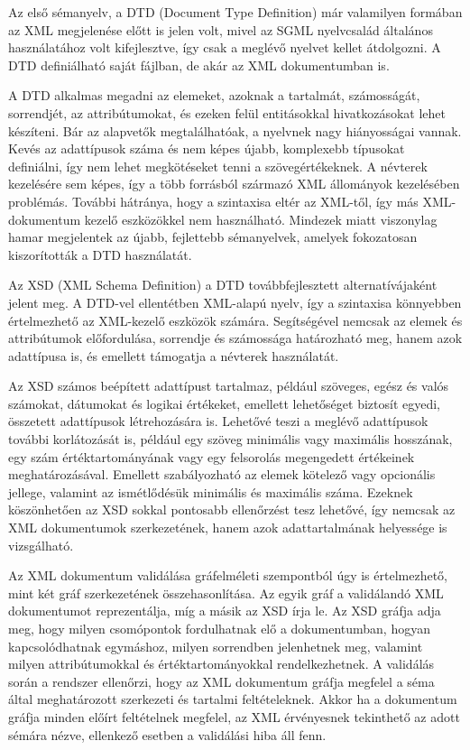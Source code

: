 Az első sémanyelv, a DTD (Document Type Definition) \cite{dtd} már valamilyen formában az XML megjelenése előtt is jelen volt, mivel az SGML nyelvcsalád általános használatához volt kifejlesztve, így csak a meglévő nyelvet kellet átdolgozni. A DTD definiálható saját fájlban, de akár az XML dokumentumban is.

A DTD alkalmas megadni az elemeket, azoknak a tartalmát, számosságát, sorrendjét, az attribútumokat, és ezeken felül entitásokkal hivatkozásokat lehet készíteni. Bár az alapvetők megtalálhatóak, a nyelvnek nagy hiányosságai vannak. Kevés az adattípusok száma és nem képes újabb, komplexebb típusokat definiálni, így nem lehet megkötéseket tenni a szövegértékeknek. A névterek kezelésére sem képes, így a több forrásból származó XML állományok kezelésében problémás. További hátránya, hogy a szintaxisa eltér az XML-től, így más XML-dokumentum kezelő eszközökkel nem használható. Mindezek miatt viszonylag hamar megjelentek az újabb, fejlettebb sémanyelvek, amelyek fokozatosan kiszorították a DTD használatát.

Az XSD (XML Schema Definition) \cite{xsd} a DTD továbbfejlesztett alternatívájaként jelent meg. A DTD-vel ellentétben XML-alapú nyelv, így a szintaxisa könnyebben értelmezhető az XML-kezelő eszközök számára. Segítségével nemcsak az elemek és attribútumok előfordulása, sorrendje és számossága határozható meg, hanem azok adattípusa is, és emellett támogatja a névterek használatát.

Az XSD számos beépített adattípust tartalmaz, például szöveges, egész és valós számokat, dátumokat és logikai értékeket, emellett lehetőséget biztosít egyedi, összetett adattípusok létrehozására is. Lehetővé teszi a meglévő adattípusok további korlátozását is, például egy szöveg minimális vagy maximális hosszának, egy szám értéktartományának vagy egy felsorolás megengedett értékeinek meghatározásával. Emellett szabályozható az elemek kötelező vagy opcionális jellege, valamint az ismétlődésük minimális és maximális száma. Ezeknek köszönhetően az XSD sokkal pontosabb ellenőrzést tesz lehetővé, így nemcsak az XML dokumentumok szerkezetének, hanem azok adattartalmának helyessége is vizsgálható.

Az XML dokumentum validálása gráfelméleti szempontból úgy is értelmezhető, mint két gráf szerkezetének összehasonlítása. Az egyik gráf a validálandó XML dokumentumot reprezentálja, míg a másik az XSD írja le. Az XSD gráfja adja meg, hogy milyen csomópontok fordulhatnak elő a dokumentumban, hogyan kapcsolódhatnak egymáshoz, milyen sorrendben jelenhetnek meg, valamint milyen attribútumokkal és értéktartományokkal rendelkezhetnek. A validálás során a rendszer ellenőrzi, hogy az XML dokumentum gráfja megfelel a séma által meghatározott szerkezeti és tartalmi feltételeknek. Akkor ha a dokumentum gráfja minden előírt feltételnek megfelel, az XML érvényesnek tekinthető az adott sémára nézve, ellenkező esetben a validálási hiba áll fenn.

